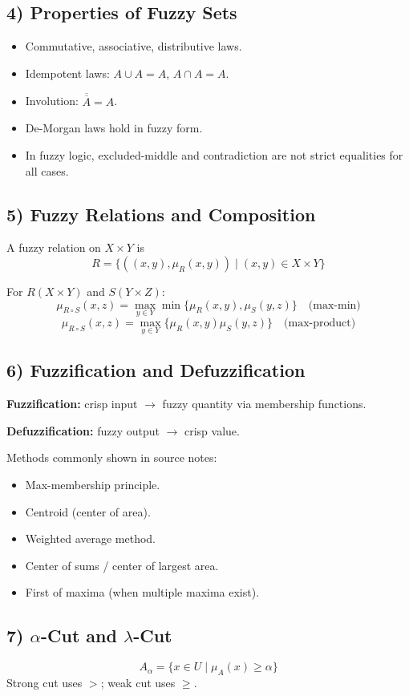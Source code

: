 \documentclass[11pt,a4paper]{article}
\begin{document}
\subsection*{4) Properties of Fuzzy Sets}
\begin{itemize}
\item Commutative, associative, distributive laws.
\item Idempotent laws: $A\cup A=A$, $A\cap A=A$.
\item Involution: $\overline{\overline{A}}=A$.
\item De-Morgan laws hold in fuzzy form.
\item In fuzzy logic, excluded-middle and contradiction are not strict equalities for all cases.
\end{itemize}

\subsection*{5) Fuzzy Relations and Composition}
A fuzzy relation on $X\times Y$ is
\[
R=\{((x,y),\mu_R(x,y))\mid (x,y)\in X\times Y\}
\]

For $R(X\times Y)$ and $S(Y\times Z)$:
\[
\mu_{R\circ S}(x,z)=\max_{y\in Y}\min\{\mu_R(x,y),\mu_S(y,z)\}\quad\text{(max-min)}
\]
\[
\mu_{R\circ S}(x,z)=\max_{y\in Y}\{\mu_R(x,y)\mu_S(y,z)\}\quad\text{(max-product)}
\]

\subsection*{6) Fuzzification and Defuzzification}
\textbf{Fuzzification:} crisp input $\rightarrow$ fuzzy quantity via membership functions.

\textbf{Defuzzification:} fuzzy output $\rightarrow$ crisp value.

Methods commonly shown in source notes:
\begin{itemize}
\item Max-membership principle.
\item Centroid (center of area).
\item Weighted average method.
\item Center of sums / center of largest area.
\item First of maxima (when multiple maxima exist).
\end{itemize}

\subsection*{7) $\alpha$-Cut and $\lambda$-Cut}
\[
A_\alpha=\{x\in U\mid \mu_A(x)\ge\alpha\}
\]
Strong cut uses $>$; weak cut uses $\ge$.
\end{document}
